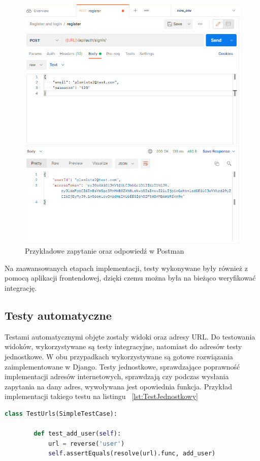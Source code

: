 \begin{figure}[H]
	\centering\includegraphics[width=\textwidth]{figures/postman1}
	\caption{Przykładowe zapytanie oraz odpowiedź w Postman}\label{rys:postman}
\end{figure}

Na zaawansowanych etapach implementacji, testy wykonywane były również z pomocą aplikacji frontendowej, dzięki czemu można była na bieżąco weryfikować integrację.

\subsection{Testy automatyczne}
Testami automatycznymi objęte zostały widoki oraz adresy URL. Do testowania widoków, wykorzystywane są testy integracyjne, natomiast do adresów testy jednostkowe. W obu przypadkach wykorzystywane są gotowe rozwiązania zaimplementowane w Django. Testy jednostkowe, sprawdzające poprawność implementacji adresów internetowych, sprawdzają czy podczas wysłania zapytania na dany adres, wywoływana jest opowiednia funkcja. Przykład implementacji takiego testu na listingu ~\ref{lst:TestJednostkowy}

\newpage
\begin{lstlisting}[language=Python, caption=Implementacja przykładowego testu jednostkowego, label={lst:TestJednostkowy}]
	class TestUrls(SimpleTestCase):
	
		def test_add_user(self):
			url = reverse('user')
			self.assertEquals(resolve(url).func, add_user)
\end{lstlisting}

